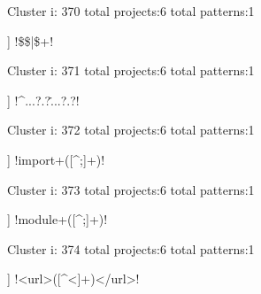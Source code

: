 Cluster i: 370
total projects:6
total patterns:1
\begin{multicols}{1}
\begin{description}[noitemsep,topsep=0pt]
\item [[6] ] \cverb!\$\$|\${\w+}!
\end{description}
\end{multicols}







Cluster i: 371
total projects:6
total patterns:1
\begin{multicols}{1}
\begin{description}[noitemsep,topsep=0pt]
\item [[6] ] \cverb!^...?.?\....?.?!
\end{description}
\end{multicols}







Cluster i: 372
total projects:6
total patterns:1
\begin{multicols}{1}
\begin{description}[noitemsep,topsep=0pt]
\item [[6] ] \cverb!import\s+([^;]+)!
\end{description}
\end{multicols}







Cluster i: 373
total projects:6
total patterns:1
\begin{multicols}{1}
\begin{description}[noitemsep,topsep=0pt]
\item [[6] ] \cverb!module\s+([^;]+)!
\end{description}
\end{multicols}







Cluster i: 374
total projects:6
total patterns:1
\begin{multicols}{1}
\begin{description}[noitemsep,topsep=0pt]
\item [[6] ] \cverb!<url>([^<]+)</url>!
\end{description}
\end{multicols}







